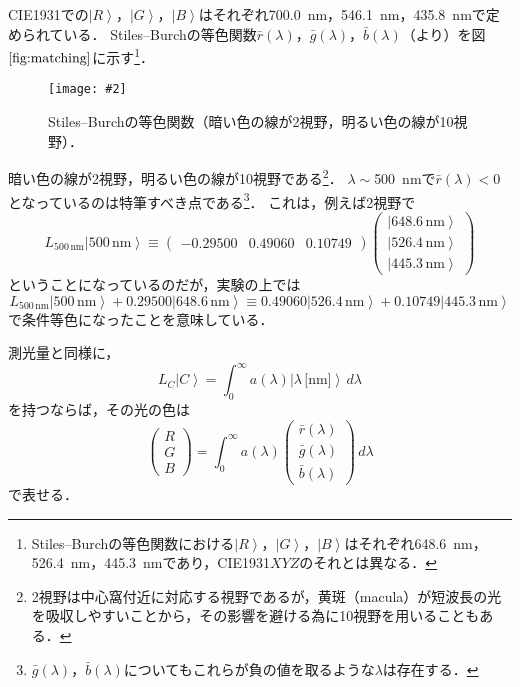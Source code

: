 \documentclass[uplatex,paper=a4,fontsize=4.0truemm,jafontsize=4.0truemm,head_space=30.0truemm,foot_space=30.0truemm,baselineskip=8.0truemm,line_length=40zw,gutter=25.0truemm,oneside,openany,fleqn,hanging_panctuation,open_bracket_pos=nibu_tentsuki,dvipdfmx,jis2004,book,titlepage]{jlreq}
\theoremstyle{mystyle}
\newcommand{\captiondot}[1]{\caption{#1．}}
\newcommand{\figureinput}[4]{\begin{figure}[btp]\centering\texttt{[image: \#2]}\captiondot{#3}\label{fig:#4}\end{figure}}
\newcommand{\mathdisplaystyle}[1]{\(\displaystyle{#1}\)}
\newcommand{\Reference}[1]{\mathdisplaystyle{\ref{#1}}}
\newcommand{\negativevalue}[1]{{-#1}}
\newcommand{\parentheses}[1]{\left(#1\right)}
\newcommand{\Diracket}[1]{\left\lvert#1\right\rangle}
\newcommand{\easymatrix}[1]{\mathord{\begin{pmatrix}#1\end{pmatrix}}}
\begin{document}
			CIE1931での\mathdisplaystyle{\Diracket{R}}，\mathdisplaystyle{\Diracket{G}}，\mathdisplaystyle{\Diracket{B}}はそれぞれ\SI{700.0}{nm}，\SI{546.1}{nm}，\SI{435.8}{nm}で定められている．
			Stiles--Burchの等色関数\mathdisplaystyle{\bar{r}\parentheses{\lambda}}，\mathdisplaystyle{\bar{g}\parentheses{\lambda}}，\mathdisplaystyle{\bar{b}\parentheses{\lambda}}（\cite{Stiles1955,Stiles1959}より）を図\Reference{fig:matching}に示す\footnote{Stiles--Burchの等色関数における\mathdisplaystyle{\Diracket{R}}，\mathdisplaystyle{\Diracket{G}}，\mathdisplaystyle{\Diracket{B}}はそれぞれ\SI{648.6}{nm}，\SI{526.4}{nm}，\SI{445.3}{nm}であり，CIE1931\mathdisplaystyle{XYZ}のそれとは異なる．}．
			\figureinput{width=\linewidth}{D:/a/figs/RGBcmf.png}{Stiles--Burchの等色関数（暗い色の線が2\textdegree 視野，明るい色の線が10\textdegree 視野）}{matching}
			暗い色の線が2\textdegree 視野，明るい色の線が10\textdegree 視野である\footnote{2\textdegree 視野は中心窩付近に対応する視野であるが，黄斑（macula）が短波長の光を吸収しやすいことから，その影響を避ける為に10\textdegree 視野を用いることもある．}．
			\mathdisplaystyle{\lambda\sim{}}\SI{500}{nm}で\mathdisplaystyle{\bar{r}\parentheses{\lambda}<0}となっているのは特筆すべき点である\footnote{\mathdisplaystyle{\bar{g}\parentheses{\lambda}}，\mathdisplaystyle{\bar{b}\parentheses{\lambda}}についてもこれらが負の値を取るような\mathdisplaystyle{\lambda}は存在する．}．
			これは，例えば2\textdegree 視野で
			\begin{equation*}
				L_{500\,\textrm{nm}}\Diracket{500\,\textrm{nm}}\equiv \easymatrix{\negativevalue{0.29500} & 0.49060 & 0.10749}\easymatrix{\Diracket{648.6\,\textrm{nm}} \\ \Diracket{526.4\,\textrm{nm}} \\ \Diracket{445.3\,\textrm{nm}}}
			\end{equation*}
			ということになっているのだが，実験の上では
			\begin{equation*}
				L_{500\,\textrm{nm}}\Diracket{500\,\textrm{nm}}+0.29500\Diracket{648.6\,\textrm{nm}}\equiv0.49060\Diracket{526.4\,\textrm{nm}}+0.10749\Diracket{445.3\,\textrm{nm}}
			\end{equation*}
			で条件等色になったことを意味している．

			測光量と同様に，
			\begin{equation*}
				L_C\Diracket{C}=\int_0^\infty{a\parentheses{\lambda}\Diracket{\lambda\,\textrm{[nm]}}}\,d\lambda
			\end{equation*}
			を持つならば，その光の色は
			\begin{equation*}
				\easymatrix{R \\ G \\ B}=\int_0^\infty{a\parentheses{\lambda}\easymatrix{\bar{r}\parentheses{\lambda} \\ \bar{g}\parentheses{\lambda} \\ \bar{b}\parentheses{\lambda}}}\,d\lambda
			\end{equation*}
			で表せる．
\end{document}
